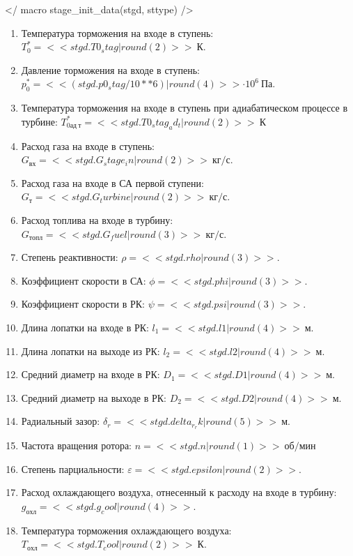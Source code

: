 \documentclass[a4paper,10pt]{article}
\begin{document}
    </ macro stage_init_data(stgd, sttype) />
    \begin{enumerate}

        \item Температура торможения на входе в ступень: $T_0^* = << stgd.T0_stag | round(2) >>\ К $.
        \item Давление торможения на входе в ступень: $p_0^* = << (stgd.p0_stag / 10**6) | round(4) >> \cdot 10^6 \ Па$.
        \item Температура торможения на входе в ступень при адиабатическом процессе в турбине: $T_{0ад\ т}^* = << stgd.T0_stag_ad_t | round(2) >>\ К$
        \item Расход газа на входе в ступень: $G_{вх} = << stgd.G_stage_in | round(2) >>\ кг/с$.
        \item Расход газа на входе в СА первой ступени: $ G_т = << stgd.G_turbine | round(2) >>\ кг/с $.
        \item Расход топлива на входе в турбину: $ G_{топл} = << stgd.G_fuel | round(3) >>\ кг/с $.
        \item Степень реактивности: $ \rho = << stgd.rho | round(3) >> $.
        \item Коэффициент скорости в СА: $ \phi = << stgd.phi | round(3) >> $.
        \item Коэффициент скорости в РК: $ \psi = << stgd.psi | round(3) >> $.
        \item Длина лопатки на входе в РК: $ l_1 = << stgd.l1 | round(4) >>\ м $.
        \item Длина лопатки на выходе из РК: $ l_2 = << stgd.l2 | round(4) >>\ м $.
        \item Средний диаметр на входе в РК: $ D_1 = << stgd.D1 | round(4) >>\ м $.
        \item Средний диаметр на выходе в РК: $ D_2 = << stgd.D2 | round(4) >>\ м $.
        \item Радиальный зазор: $ \delta_r = << stgd.delta_r_rk | round(5) >>\ м $.
        \item Частота вращения ротора: $ n = << stgd.n | round(1) >>\ об/мин $
        \item Степень парциальности: $ \varepsilon = << stgd.epsilon | round(2) >> $.
        \item Расход охлаждающего воздуха, отнесенный к расходу на входе в турбину: $ g_{охл} = << stgd.g_cool | round(4) >> $.
        \item Температура торможения охлаждающего воздуха: $ T_{охл} = << stgd.T_cool | round(2) >>\ К $.


\end{enumerate}
\end{document}
